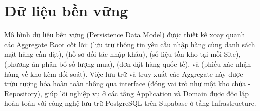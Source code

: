 \section{Dữ liệu bền vững}

Mô hình dữ liệu bền vững (Persistence Data Model) được thiết kế xoay quanh các Aggregate Root cốt lõi:  (lưu trữ thông tin yêu cầu nhập hàng cùng danh sách mặt hàng cần đặt),  (hồ sơ đối tác nhập khẩu),  (số liệu tồn kho tại mỗi Site),  (phương án phân bổ số lượng mua),  (đơn đặt hàng quốc tế), và  (phiếu xác nhận hàng về kho kèm đối soát). Việc lưu trữ và truy xuất các Aggregate này được trừu tượng hóa hoàn toàn thông qua interface  (đóng vai trò như một kho chứa - Repository), giúp lõi nghiệp vụ ở các tầng Application và Domain được độc lập hoàn toàn với công nghệ lưu trữ PostgreSQL trên Supabase ở tầng Infrastructure.
